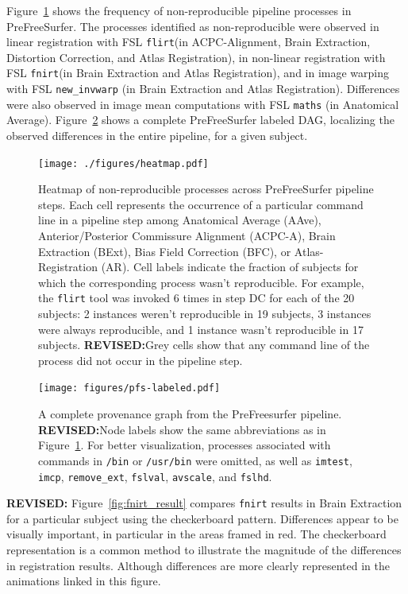 \documentclass[a4paper,num-refs]{oup-contemporary}
\newcommand{\revised}[1]{\color{blue}\textbf{REVISED:}#1\color{black}}
\newcommand{\flirt}[0]{\texttt{flirt}\xspace}
\newcommand{\fnirt}[0]{\texttt{fnirt}\xspace}
\begin{document}
Figure~\ref{fig:pfs_heatmap} shows the frequency of non-reproducible pipeline processes
in PreFreeSurfer. 
The processes identified as non-reproducible were observed in linear registration 
with FSL \flirt (in ACPC-Alignment, Brain Extraction, Distortion Correction, and
Atlas Registration), in non-linear registration with FSL \fnirt (in Brain Extraction 
and Atlas Registration), and in image warping with FSL \texttt{new\_invwarp} (in Brain Extraction 
and Atlas Registration). Differences were also observed in image mean 
computations with FSL \texttt{maths}  (in Anatomical Average). 
Figure~\ref{fig:complete_pfs} shows a complete PreFreeSurfer labeled DAG, localizing 
the observed differences in the entire pipeline, for a given subject.
\begin{figure}
\centering
  \texttt{[image: ./figures/heatmap.pdf]}
  \caption{Heatmap of non-reproducible processes across PreFreeSurfer pipeline steps.
  Each cell represents the occurrence of a particular command line in a
  pipeline step among Anatomical Average (AAve), Anterior/Posterior
  Commissure Alignment (ACPC-A), Brain Extraction (BExt), Bias Field
  Correction (BFC), or Atlas-Registration (AR). Cell labels indicate the
  fraction of subjects for which the corresponding process wasn't reproducible. For example,
  the \flirt tool was invoked 6 times in step DC for each of the 20
  subjects: 2 instances weren't reproducible in 19 subjects, 3
  instances were always reproducible, and 1 instance wasn't reproducible in
  17 subjects. 
  \revised{Grey cells show that any command line of the process did not occur in the pipeline step.}}
  \label{fig:pfs_heatmap}
\end{figure}

\begin{figure} 
   \centering
    \texttt{[image: figures/pfs-labeled.pdf]} 
    \caption{A complete provenance graph from the PreFreesurfer pipeline. 
    \revised{Node labels show the same abbreviations as in Figure~\ref{fig:pfs_heatmap}.}
    For better visualization, processes associated with commands 
    in \texttt{/bin} or \texttt{/usr/bin} were omitted, as well as 
  \texttt{imtest}, \texttt{imcp}, \texttt{remove\_ext}, \texttt{fslval}, \texttt{avscale}, and \texttt{fslhd}.}
    \label{fig:complete_pfs}
\end{figure}

\revised{
Figure~\ref{fig:fnirt_result} compares \fnirt results in Brain Extraction
for a particular subject using the checkerboard pattern.
Differences appear to be visually important, in particular in the areas framed in red.
The checkerboard representation is a common method to illustrate the magnitude of the differences in registration results.
Although differences are more clearly represented in the animations linked in this figure.}
\end{document}
